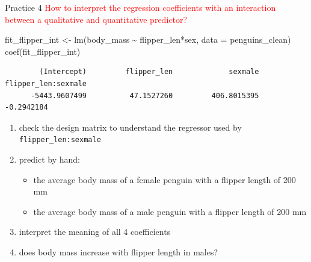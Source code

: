 \documentclass[
  10pt,
  ignorenonframetext,
  aspectratio=169,
  t]{beamer}
\newenvironment{Shaded}{\begin{snugshade}}{\end{snugshade}}
\newcommand{\AttributeTok}[1]{\textcolor[rgb]{0.40,0.45,0.13}{#1}}
\newcommand{\FunctionTok}[1]{\textcolor[rgb]{0.28,0.35,0.67}{#1}}
\newcommand{\NormalTok}[1]{\textcolor[rgb]{0.00,0.23,0.31}{#1}}
\newcommand{\OtherTok}[1]{\textcolor[rgb]{0.00,0.23,0.31}{#1}}
\newcommand{\SpecialCharTok}[1]{\textcolor[rgb]{0.37,0.37,0.37}{#1}}
\providecommand{\tightlist}{%
  \setlength{\itemsep}{0pt}\setlength{\parskip}{0pt}}
\let\oldtexttt\texttt
\renewcommand{\texttt}[1]{\colorbox{gray!20}{\oldtexttt{#1}}}
\begin{document}
\begin{frame}[fragile]{Practice 4}
\protect{}\label{practice-4}
\textcolor{red}{How to interpret the regression coefficients with an interaction between a qualitative and quantitative predictor?}

\footnotesize

\begin{Shaded}
\begin{Highlighting}[]
\NormalTok{fit\_flipper\_int }\OtherTok{\textless{}{-}} \FunctionTok{lm}\NormalTok{(body\_mass }\SpecialCharTok{\textasciitilde{}}\NormalTok{ flipper\_len}\SpecialCharTok{*}\NormalTok{sex, }\AttributeTok{data =}\NormalTok{ penguins\_clean)}
\FunctionTok{coef}\NormalTok{(fit\_flipper\_int)}
\end{Highlighting}
\end{Shaded}

\begin{verbatim}
        (Intercept)         flipper_len             sexmale flipper_len:sexmale 
      -5443.9607499          47.1527260         406.8015395          -0.2942184 
\end{verbatim}

\normalsize

\begin{enumerate}
\tightlist
\item
  check the design matrix to understand the regressor used by
  \texttt{flipper\_len:sexmale}
\item
  predict by hand:

  \begin{itemize}
  \tightlist
  \item
    the average body mass of a female penguin with a flipper length of
    200 mm
  \item
    the average body mass of a male penguin with a flipper length of 200
    mm
  \end{itemize}
\item
  interpret the meaning of all 4 coefficients
\item
  does body mass increase with flipper length in males?
\end{enumerate}
\end{frame}
\end{document}
